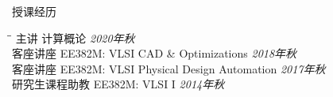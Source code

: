 \begin{rSection}{授课经历}

\begin{tabbing}
\hspace{3.3in}\= \hspace{3.1in}\= \kill
主讲 \> 计算概论 \> {\em 2020年秋 } \\
客座讲座 \> EE382M: VLSI CAD \& Optimizations \> {\em 2018年秋 } \\
客座讲座 \> EE382M: VLSI Physical Design Automation \> {\em 2017年秋 } \\
研究生课程助教 \> EE382M: VLSI I \> {\em 2014年秋 }
\end{tabbing}

\end{rSection}
